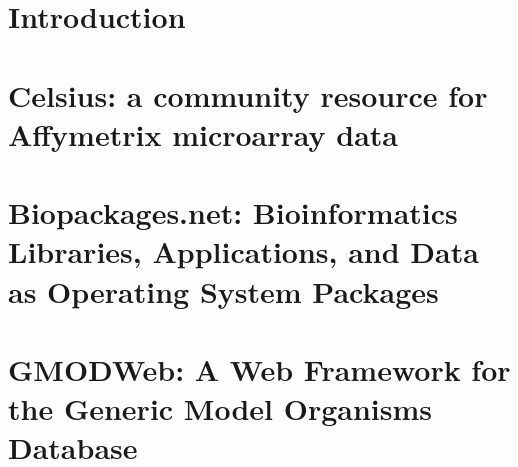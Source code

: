 \documentclass [PhD] {uclathes}
\title          {\dbthesis} %
\author         {Allen Jason Day}
\begin{document}
\makeintropages

%
%


\chapter{Introduction}


\chapter{Celsius: a community resource for Affymetrix microarray data}


%
%
%
%
\chapter{Biopackages.net: Bioinformatics Libraries, Applications, and Data as Operating System Packages}


\chapter{GMODWeb: A Web Framework for the Generic Model Organisms Database}


\appendix
\end{document}
